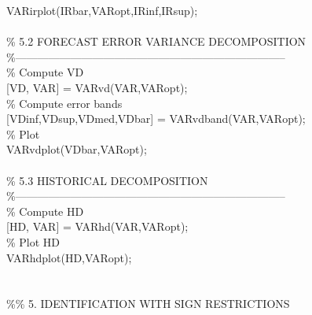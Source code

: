 \hspace{1mm}VARirplot(IRbar,VARopt,IRinf,IRsup); \\ 
\hspace{1mm} \\ 
\hspace{1mm}\textcolor{matlabgreen}{\% 5.2 FORECAST ERROR VARIANCE DECOMPOSITION }\\ 
\hspace{1mm}\textcolor{matlabgreen}{\%--------------------------------------------------------------------------  }\\ 
\hspace{1mm}\textcolor{matlabgreen}{\% Compute VD }\\ 
\hspace{1mm}[VD, VAR] = VARvd(VAR,VARopt); \\ 
\hspace{1mm}\textcolor{matlabgreen}{\% Compute error bands }\\ 
\hspace{1mm}[VDinf,VDsup,VDmed,VDbar] = VARvdband(VAR,VARopt); \\ 
\hspace{1mm}\textcolor{matlabgreen}{\% Plot }\\ 
\hspace{1mm}VARvdplot(VDbar,VARopt); \\ 
\hspace{1mm} \\ 
\hspace{1mm}\textcolor{matlabgreen}{\% 5.3 HISTORICAL DECOMPOSITION }\\ 
\hspace{1mm}\textcolor{matlabgreen}{\%--------------------------------------------------------------------------  }\\ 
\hspace{1mm}\textcolor{matlabgreen}{\% Compute HD }\\ 
\hspace{1mm}[HD, VAR] = VARhd(VAR,VARopt); \\ 
\hspace{1mm}\textcolor{matlabgreen}{\% Plot HD }\\ 
\hspace{1mm}VARhdplot(HD,VARopt); \\ 
\hspace{1mm} \\ 
\hspace{1mm} \\ 
\hspace{1mm}\textcolor{matlabgreen}{\%}\textcolor{matlabgreen}{\% 5. IDENTIFICATION WITH SIGN RESTRICTIONS }\\ 
